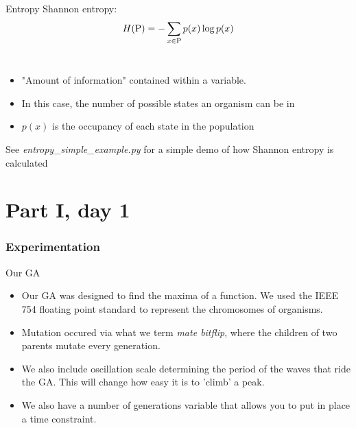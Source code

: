 \documentclass[10pt,aspectratio=169]{beamer}
\begin{document}
\begin{frame}{Entropy}
		Shannon entropy:
$$
H({\rm P}) = -\sum_{x \in {\rm P}} p(x)\log p(x)
\label{eq:shannon-entropy-def}
$$
		\\
		\medskip
		\begin{itemize}
			\item "Amount of information" contained within
                          a variable.
			\item In this case, the number of possible states an organism can be in
			\item $p(x)$ is the occupancy of each state in the population
		\end{itemize}
		\bigskip
		See \emph{entropy\_simple\_example.py} for a simple
                demo of how Shannon entropy is calculated
\end{frame}

\part{Part I, day 1}

\section{Experimentation}


\begin{frame}{Our GA}
	\begin{itemize}
		\item
		Our GA was designed to find the maxima of a function. We used the IEEE 754 floating point standard to represent the chromosomes of organisms.
		\item Mutation occured via what we term \emph{mate bitflip}, where the children of two parents mutate every generation.
		\item We also include oscillation scale determining the period of the waves that ride the GA. This will change how easy it is to 'climb' a peak.
		\item We also have a number of generations variable that allows you to put in place a time constraint.
		
		
	\end{itemize}
\end{frame}
\end{document}

